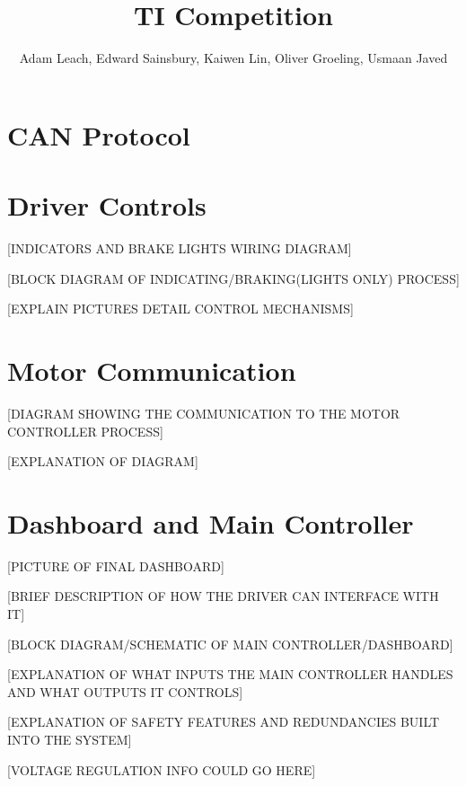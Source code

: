\documentclass[10pt,a4paper]{article}
\begin{document}
\title{TI Competition}
\author{Adam Leach, Edward Sainsbury, Kaiwen Lin, Oliver Groeling, Usmaan Javed}
\maketitle
\tableofcontents
\section{CAN Protocol}
\section{Driver Controls}
[INDICATORS AND BRAKE LIGHTS WIRING DIAGRAM]

[BLOCK DIAGRAM OF INDICATING/BRAKING(LIGHTS ONLY) PROCESS]

[EXPLAIN PICTURES DETAIL CONTROL MECHANISMS]

\section{Motor Communication}
[DIAGRAM SHOWING THE COMMUNICATION TO THE MOTOR CONTROLLER PROCESS]

[EXPLANATION OF DIAGRAM]

\section{Dashboard and Main Controller}
[PICTURE OF FINAL DASHBOARD]

[BRIEF DESCRIPTION OF HOW THE DRIVER CAN INTERFACE WITH IT]

[BLOCK DIAGRAM/SCHEMATIC OF MAIN CONTROLLER/DASHBOARD]

[EXPLANATION OF WHAT INPUTS THE MAIN CONTROLLER HANDLES AND WHAT OUTPUTS IT CONTROLS]

[EXPLANATION OF SAFETY FEATURES AND REDUNDANCIES BUILT INTO THE SYSTEM]

[VOLTAGE REGULATION INFO COULD GO HERE]
\end{document}
